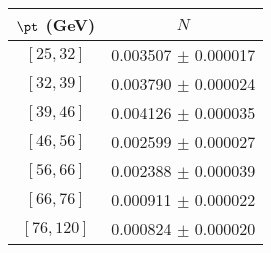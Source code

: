 \begin{tabular}{c||c}
$\pt$ (GeV) & $N$  \\
\hline
$[25, 32]$ & 0.003507 $\pm$ 0.000017\\
$[32, 39]$ & 0.003790 $\pm$ 0.000024\\
$[39, 46]$ & 0.004126 $\pm$ 0.000035\\
$[46, 56]$ & 0.002599 $\pm$ 0.000027\\
$[56, 66]$ & 0.002388 $\pm$ 0.000039\\
$[66, 76]$ & 0.000911 $\pm$ 0.000022\\
$[76, 120]$ & 0.000824 $\pm$ 0.000020\\
\end{tabular}
